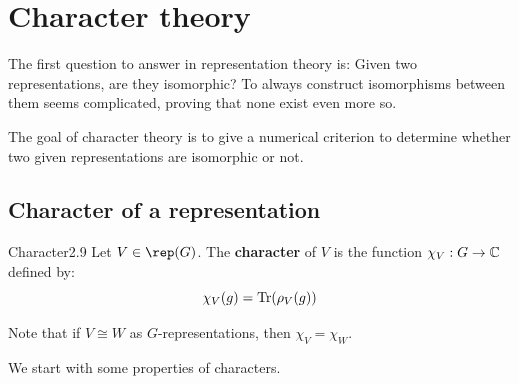 \documentclass[twoside = false,	%
		headsepline,		%
		parskip = true,
		]{scrbook}						%
\begin{document}
\section{Character theory}
    The first question to answer in representation theory is: Given two representations, are they isomorphic? To always construct isomorphisms between them seems complicated, proving that none exist even more so.
    
    The goal of character theory is to give a numerical criterion to determine whether two given representations are isomorphic or not.
    
    \subsection{Character of a representation}
        \begin{definition}{Character}{2.9}
            Let $V\in\rep(G)$. The \textbf{character} of $V$ is the function $\chi_V : G\to \mathbb C$ defined by:
            \begin{equation*}
                \chi_V(g)=\mathrm{Tr}(\rho_V(g))
            \end{equation*}
        \end{definition}
        Note that if $V\cong W$ as $G$-representations, then $\chi_V = \chi_W$.
        
        We start with some properties of characters.
        
\end{document}

